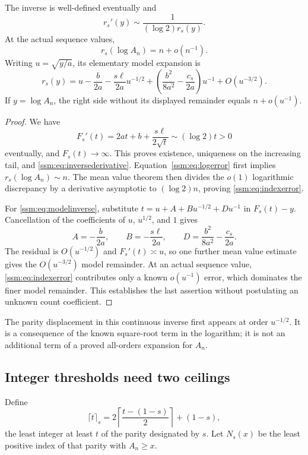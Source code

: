 \begin{proposition}\label{ssm:prop:inverse}
The inverse is well-defined eventually and
\begin{equation}\label{ssm:eq:inversederivative}
 r_s'(y)\sim\frac1{(\log2)r_s(y)}.
\end{equation}
At the actual sequence values,
\begin{equation}\label{ssm:eq:indexerror}
 r_s(\log A_n)=n+o(n^{-1}).
\end{equation}
Writing $u=\sqrt{y/a}$, its elementary model expansion is
\begin{equation}\label{ssm:eq:modelinverse}
 r_s(y)=u-\frac b{2a}-\frac{s\ell}{2a}u^{-1/2}
 +\left(\frac{b^2}{8a^2}-\frac{c_s}{2a}\right)u^{-1}
 +O(u^{-3/2}).
\end{equation}
If $y=\log A_n$, the right side without its displayed remainder equals $n+o(u^{-1})$.
\end{proposition}
\begin{proof}
We have
\[
 F_s'(t)=2at+b+\frac{s\ell}{2\sqrt t}\sim(\log2)t>0
\]
eventually, and $F_s(t)\to\infty$. This proves existence, uniqueness on the increasing tail, and \eqref{ssm:eq:inversederivative}. Equation~\eqref{ssm:eq:logerror} first implies $r_s(\log A_n)\sim n$. The mean value theorem then divides the $o(1)$ logarithmic discrepancy by a derivative asymptotic to $(\log2)n$, proving \eqref{ssm:eq:indexerror}.

For \eqref{ssm:eq:modelinverse}, substitute
$t=u+A+Bu^{-1/2}+Du^{-1}$ in $F_s(t)-y$. Cancellation of the coefficients of $u$, $u^{1/2}$, and $1$ gives
\[
 A=-\frac b{2a},\qquad B=-\frac{s\ell}{2a},\qquad
 D=\frac{b^2}{8a^2}-\frac{c_s}{2a}.
\]
The residual is $O(u^{-1/2})$ and $F_s'(t)\asymp u$, so one further mean value estimate gives the $O(u^{-3/2})$ model remainder. At an actual sequence value, \eqref{ssm:eq:indexerror} contributes only a known $o(u^{-1})$ error, which dominates the finer model remainder. This establishes the last assertion without postulating an unknown count coefficient.
\end{proof}

The parity displacement in this continuous inverse first appears at order $u^{-1/2}$. It is a consequence of the known square-root term in the logarithm; it is not an additional term of a proved all-orders expansion for $A_n$.

\subsection{Integer thresholds need two ceilings}
Define
\[
 \lceil t\rceil_s=2\left\lceil\frac{t-(1-s)}2\right\rceil+(1-s),
\]
the least integer at least $t$ of the parity designated by $s$. Let $N_s(x)$ be the least positive index of that parity with $A_n\ge x$.

